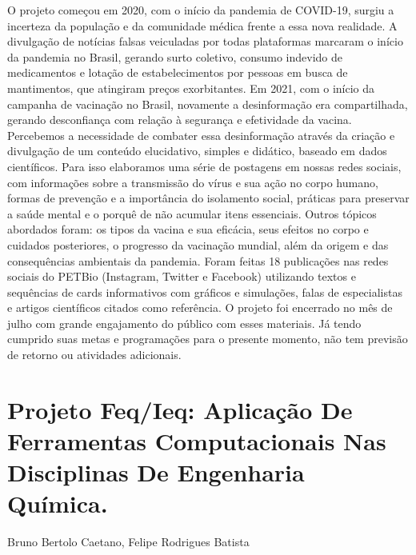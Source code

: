 O projeto começou em 2020, com o início da pandemia de COVID-19, surgiu a incerteza da
população e da comunidade médica frente a essa nova realidade. A divulgação de notícias falsas
veiculadas por todas plataformas marcaram o início da pandemia no Brasil, gerando surto
coletivo, consumo indevido de medicamentos e lotação de estabelecimentos por pessoas em
busca de mantimentos, que atingiram preços exorbitantes. Em 2021, com o início da campanha
de vacinação no Brasil, novamente a desinformação era compartilhada, gerando desconfiança
com relação à segurança e efetividade da vacina. Percebemos a necessidade de combater essa
desinformação através da criação e divulgação de um conteúdo elucidativo, simples e didático,
baseado em dados científicos. Para isso elaboramos uma série de postagens em nossas redes
sociais, com informações sobre a transmissão do vírus e sua ação no corpo humano, formas de
prevenção e a importância do isolamento social, práticas para preservar a saúde mental e o
porquê de não acumular itens essenciais. Outros tópicos abordados foram: os tipos da vacina e
sua eficácia, seus efeitos no corpo e cuidados posteriores, o progresso da vacinação mundial,
além da origem e das consequências ambientais da pandemia. Foram feitas 18 publicações nas
redes sociais do PETBio (Instagram, Twitter e Facebook) utilizando textos e sequências de cards
informativos com gráficos e simulações, falas de especialistas e artigos científicos citados como
referência. O projeto foi encerrado no mês de julho com grande engajamento do público com
esses materiais. Já tendo cumprido suas metas e programações para o presente momento, não
tem previsão de retorno ou atividades adicionais.




\section*{Projeto Feq/Ieq: Aplicação De Ferramentas Computacionais Nas Disciplinas De Engenharia Química.}

Bruno Bertolo Caetano, Felipe Rodrigues Batista

